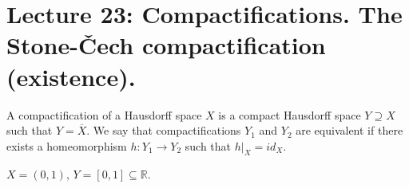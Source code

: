 \documentclass[main.tex]{subfiles}
\begin{document}
\pagestyle{plain}
\setcounter{chapter}{22}

\chapter{Lecture 23: Compactifications. The Stone-Čech compactification (existence). }
\label{chap:chapter23}

\begin{definition}
    A compactification of a Hausdorff space $X$ is a compact Hausdorff space $Y \supseteq X$ such that $Y = \overline{X}$. We say that compactifications $Y_1$ and $Y_2$ are equivalent if there exists a homeomorphism $h: Y_1 \to Y_2$ such that $h|_{X} = id_{X}$.
\end{definition}

\begin{example}
    $X = (0, 1)$, $Y = [0, 1] \subseteq \mathbb{R}$. 
\end{example}
\end{document}
